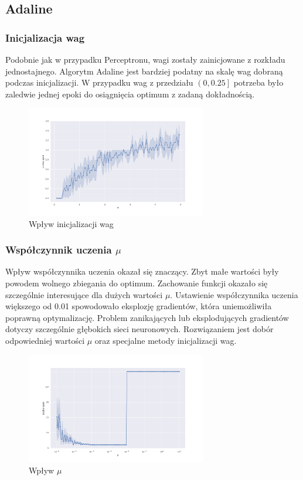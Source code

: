 \documentclass{article}
\begin{document}
\subsection {Adaline}

\subsubsection{Inicjalizacja wag}
Podobnie jak w przypadku Perceptronu, wagi zostały zainicjowane z rozkładu jednostajnego.
Algorytm Adaline jest bardziej podatny na skalę wag dobraną podczas inicjalizacji.
W przypadku wag z przedziału $\left(0, 0.25\right]$ potrzeba było zaledwie jednej
epoki do osiągnięcia optimum z zadaną dokładnością.

\begin{figure}[h]
  \caption{Wpływ inicjalizacji wag}
  \centering
    \includegraphics[width=0.7\textwidth]{images/06_ada_interval.png}
\end{figure}


\subsubsection{Współczynnik uczenia $\mu$}
Wpływ współczynnika uczenia okazał się znaczący.
Zbyt małe wartości były powodem wolnego zbiegania do optimum.
Zachowanie funkcji okazało się szczególnie interesujące dla dużych wartości $\mu$.
Ustawienie współczynnika uczenia większego od 0.01 spowodowało eksplozję gradientów, która uniemożliwiła poprawną optymalizację.
Problem zanikających lub eksplodujących gradientów dotyczy szczególnie głębokich sieci neuronowych.
Rozwiązaniem jest dobór odpowiedniej wartości $\mu$ oraz specjalne metody inicjalizacji wag.


\begin{figure}[h]
  \caption{Wpływ $\mu$}
  \centering
    \includegraphics[width=0.7\textwidth]{images/07_ada_lr.png}
\end{figure}
\end{document}

